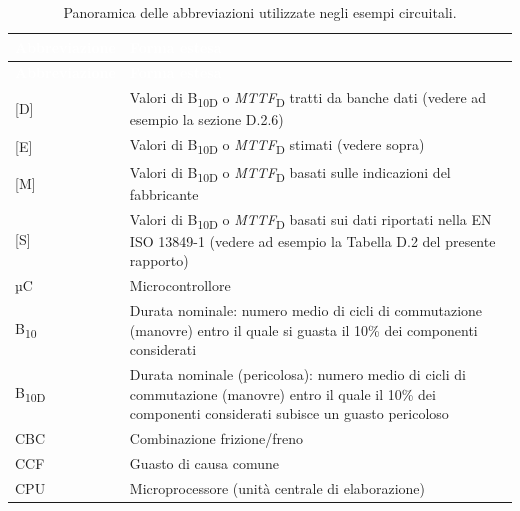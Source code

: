 \begingroup
{}
\fontsize{9}{11}\selectfont
\setlength{\tabcolsep}{4pt}
\renewcommand{\arraystretch}{1.2}
\setlength{\LTcapwidth}{\textwidth}
\begin{longtable}{|p{2.4cm}|p{\dimexpr\textwidth-2.4cm-4\tabcolsep-3\arrayrulewidth\relax}|}
    \caption{Panoramica delle abbreviazioni utilizzate negli esempi circuitali.}
    \label{tab:08-2} \\
    \hline
    \rowcolor{tabblue}
    \textcolor{white}{\textbf{Abbreviazione}} & \textcolor{white}{\textbf{Forma estesa}} \\
    \hline
    \endfirsthead
    \hline
    \rowcolor{tabblue}
    \textcolor{white}{\textbf{Abbreviazione}} & \textcolor{white}{\textbf{Forma estesa}} \\
    \hline
    \endhead
    \hline
    \endfoot
    \rowcolor{black!8}
    {[D]} & Valori di B\textsubscript{10D} o \textit{MTTF}\textsubscript{D} tratti da banche dati (vedere ad esempio la sezione D.2.6) \\
    \hline
    {[E]} & Valori di B\textsubscript{10D} o \textit{MTTF}\textsubscript{D} stimati (vedere sopra) \\
    \hline
    \rowcolor{black!8}
    {[M]} & Valori di B\textsubscript{10D} o \textit{MTTF}\textsubscript{D} basati sulle indicazioni del fabbricante \\
    \hline
    {[S]} & Valori di B\textsubscript{10D} o \textit{MTTF}\textsubscript{D} basati sui dati riportati nella EN ISO 13849-1 (vedere ad esempio la Tabella D.2 del presente rapporto) \\
    \hline
    \rowcolor{black!8}
    µC & Microcontrollore \\
    \hline
    B\textsubscript{10} & Durata nominale: numero medio di cicli di commutazione (manovre) entro il quale si guasta il 10\% dei componenti considerati \\
    \hline
    \rowcolor{black!8}
    B\textsubscript{10D} & Durata nominale (pericolosa): numero medio di cicli di commutazione (manovre) entro il quale il 10\% dei componenti considerati subisce un guasto pericoloso \\
    \hline
    CBC & Combinazione frizione/freno \\
    \hline
    \rowcolor{black!8}
    CCF & Guasto di causa comune \\
    \hline
    CPU & Microprocessore (unità centrale di elaborazione) \\
    \hline

\end{longtable}
